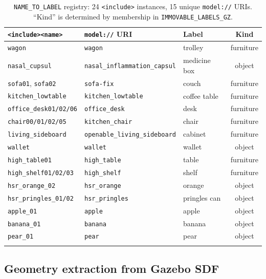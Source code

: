 \documentclass[11pt]{article}
\begin{document}
\begin{center}
\begin{longtable}{l l l c}
\toprule
\textbf{\texttt{<include><name>}} & \textbf{\texttt{model://} URI} & \textbf{Label} & \textbf{Kind} \\
\midrule
\endhead
\texttt{wagon} & \texttt{wagon} & trolley & furniture \\
\texttt{nasal\_cupsul} & \texttt{nasal\_inflammation\_capsul} & medicine box & object \\
\texttt{sofa01}, \texttt{sofa02} & \texttt{sofa-fix} & couch & furniture \\
\texttt{kitchen\_lowtable} & \texttt{kitchen\_lowtable} & coffee table & furniture \\
\texttt{office\_desk01/02/06} & \texttt{office\_desk} & desk & furniture \\
\texttt{chair00/01/02/05} & \texttt{kitchen\_chair} & chair & furniture \\
\texttt{living\_sideboard} & \texttt{openable\_living\_sideboard} & cabinet & furniture \\
\texttt{wallet} & \texttt{wallet} & wallet & object \\
\texttt{high\_table01} & \texttt{high\_table} & table & furniture \\
\texttt{high\_shelf01/02/03} & \texttt{high\_shelf} & shelf & furniture \\
\texttt{hsr\_orange\_02} & \texttt{hsr\_orange} & orange & object \\
\texttt{hsr\_pringles\_01/02} & \texttt{hsr\_pringles} & pringles can & object \\
\texttt{apple\_01} & \texttt{apple} & apple & object \\
\texttt{banana\_01} & \texttt{banana} & banana & object \\
\texttt{pear\_01} & \texttt{pear} & pear & object \\
\bottomrule
\caption{\texttt{NAME\_TO\_LABEL} registry: 24 \texttt{<include>} instances,
15 unique \texttt{model://} URIs. ``Kind'' is determined by membership in
\texttt{IMMOVABLE\_LABELS\_GZ}.}
\label{tab:nametolabel}
\end{longtable}
\end{center}

\subsection{Geometry extraction from Gazebo SDF}
\label{sec:geomextract}
\end{document}
